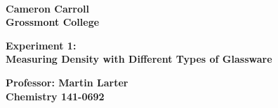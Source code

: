 \documentclass[fleqn,titlepage]{article}
\begin{document}
\begin{titlepage}
  \mbox{}\\[1.25cm]
  \textbf{\LARGE Cameron Carroll \\ Grossmont College}\\[2.25cm]
  \begin{center}
    \textbf{\huge Experiment 1: \\ Measuring Density with Different Types of Glassware}\\[2.50cm]
  \end{center}
  \textbf{\LARGE Professor: Martin Larter \\ Chemistry 141-0692}
  \vfill
\end{titlepage}

\pagebreak
\newpage
\end{document}
